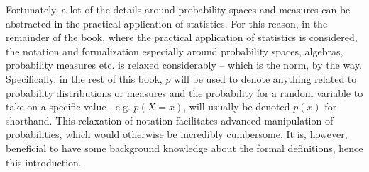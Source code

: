 \begin{remark}
\label{sec:notation}
Fortunately, a lot of the details around probability spaces and measures can be abstracted in the practical application of statistics. For this reason, in the remainder of the book, where the practical application of statistics is considered, the notation and formalization especially around probability spaces, algebras, probability measures etc. is relaxed considerably -- which is the norm, by the way. Specifically, in the rest of this book, $p$ will be used to denote anything related to probability distributions or measures and the probability for a random variable to take on a specific value , e.g. $p(X=x)$, will usually be denoted $p(x)$ for shorthand. This relaxation of notation facilitates advanced manipulation of probabilities, which would otherwise be incredibly cumbersome. It is, however, beneficial to have some background knowledge about the formal definitions, hence this introduction.
\end{remark}
